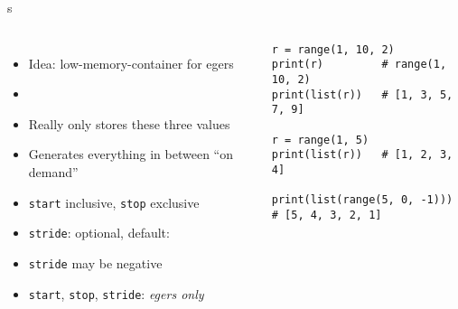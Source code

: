\begin{frame}[fragile]{s}
%
\vspace{-15pt}
\begin{columns}[t]
\begin{itemize}
\item Idea: low-memory-container for egers
\item {}
\item Really only stores these three values
\item Generates everything in between \enquote{on demand}
\item \texttt{start} inclusive, \texttt{stop} exclusive
\item \texttt{stride}: optional, default: 
\item \texttt{stride} may be negative
\item \texttt{start}, \texttt{stop}, \texttt{stride}: \emph{egers only}
\end{itemize}
%
\begin{codebox}
\begin{verbatim}
r = range(1, 10, 2)
print(r)         # range(1, 10, 2)
print(list(r))   # [1, 3, 5, 7, 9]

r = range(1, 5)
print(list(r))   # [1, 2, 3, 4]

print(list(range(5, 0, -1)))
# [5, 4, 3, 2, 1]

\end{verbatim}
\end{codebox}
\end{columns}
%
\end{frame}


